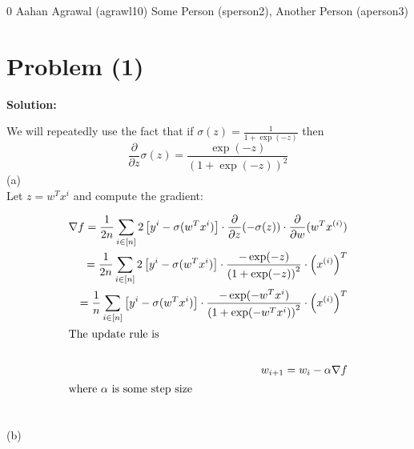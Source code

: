 \documentclass[../main.tex]{subfiles}
\begin{document}
\homework
    {0}
    {Aahan Agrawal (agrawl10)}
    {Some Person (sperson2), Another Person (aperson3)}

\section*{Problem (1)}
\textbf{Solution:} 

We will repeatedly use the fact that if $\sigma(z) = \frac{1}{1 + \exp(-z)}$ then\[ \frac{\partial}{\partial z}\sigma(z) = \frac{\exp(-z)}{\left(1 + \exp(-z)\right)^2} \]
(a)\\

Let $z = w^Tx^{i}$ and compute the gradient:

\begin{align*}
    \nabla f = \frac{1}{2n}\sum_{i \in [n]}^{}2\left[y^{i} - \sigma(w^Tx^{i})\right] \cdot \frac{\partial}{\partial z}(-\sigma(z)) \cdot \frac{\partial}{\partial w}(w^Tx^{(i)}) \\
    = \frac{1}{2n}\sum_{i \in [n]}^{}2\left[y^{i} - \sigma(w^Tx^{i})\right] \cdot  \frac{- \exp(-z)}{\left(1 + \exp(-z)\right)^2} \cdot \left(x^{(i)}\right)^T \\
    = \frac{1}{n}\sum_{i \in [n]}^{}\left[y^{i} - \sigma(w^Tx^{i})\right] \cdot  \frac{- \exp(-w^Tx^{i})}{\left(1 + \exp(-w^Tx^{i})\right)^2} \cdot \left(x^{(i)}\right)^T \\
    \intertext{The update rule is} \\
    w_{i+1} = w_{i} - \alpha \nabla f \\
    \intertext{where $\alpha$ is some step size} \\
\end{align*}

(b) \\
\end{document}

